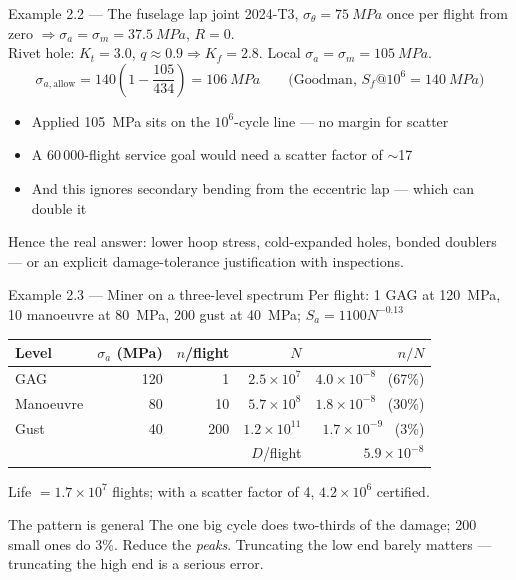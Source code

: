 \documentclass[aspectratio=169,10pt]{beamer}
\begin{document}
\begin{frame}{Example 2.2 --- The fuselage lap joint}
2024-T3, $\sigma_\theta=\SI{75}{MPa}$ once per flight from zero $\Rightarrow \sigma_a=\sigma_m=\SI{37.5}{MPa}$, $R=0$.\\
Rivet hole: $K_t=3.0$, $q\approx0.9 \Rightarrow K_f=2.8$. Local $\sigma_a=\sigma_m=\SI{105}{MPa}$.
\[
\sigma_{a,\text{allow}}=140\left(1-\frac{105}{434}\right)=\SI{106}{MPa}
\qquad\text{(Goodman, }S_f@10^6=\SI{140}{MPa})
\]
\begin{itemize}
  \item Applied \SI{105}{MPa} sits \alert{on} the $10^{6}$-cycle line --- no margin for scatter
  \item A 60\,000-flight service goal would need a scatter factor of $\sim$17
  \item And this ignores secondary bending from the eccentric lap --- which can double it
\end{itemize}
\begin{block}{}
Hence the real answer: lower hoop stress, cold-expanded holes, bonded doublers --- or an explicit damage-tolerance justification with inspections.
\end{block}
\end{frame}

\begin{frame}{Example 2.3 --- Miner on a three-level spectrum}
Per flight: 1 GAG at \SI{120}{MPa}, 10 manoeuvre at \SI{80}{MPa}, 200 gust at \SI{40}{MPa}; $S_a=1100N^{-0.13}$
\vspace{2pt}
\centering\footnotesize
\begin{tabular}{@{}lrrrr@{}}
\toprule
Level & $\sigma_a$ (MPa) & $n$/flight & $N$ & $n/N$ \\
\midrule
GAG & 120 & 1 & $2.5\times10^{7}$ & $4.0\times10^{-8}$ \ (67\%) \\
Manoeuvre & 80 & 10 & $5.7\times10^{8}$ & $1.8\times10^{-8}$ \ (30\%) \\
Gust & 40 & 200 & $1.2\times10^{11}$ & $1.7\times10^{-9}$ \ (3\%) \\
\midrule
& & & $D$/flight & $5.9\times10^{-8}$ \\
\bottomrule
\end{tabular}
\vspace{4pt}

\raggedright\normalsize Life $=1.7\times10^{7}$ flights; with a scatter factor of 4, $4.2\times10^{6}$ certified.
\begin{alertblock}{The pattern is general}
The one big cycle does two-thirds of the damage; 200 small ones do 3\%. Reduce the \emph{peaks}. Truncating the low end barely matters --- truncating the high end is a serious error.
\end{alertblock}
\end{frame}
\end{document}
